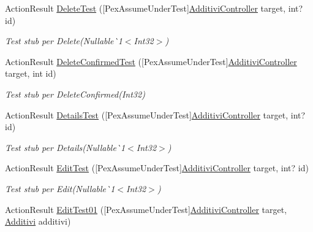 \begin{DoxyCompactItemize}
Action\+Result \mbox{\hyperlink{class_brew_day2_1_1_tests_1_1_additivi_controller_test_a00b7debb47483c49027e9a64b4bed1f7}{Delete\+Test}} (\mbox{[}Pex\+Assume\+Under\+Test\mbox{]}\mbox{\hyperlink{class_brew_day2_1_1_controllers_1_1_additivi_controller}{Additivi\+Controller}} target, int? id)
\begin{DoxyCompactList}\small\item\em Test stub per Delete(Nullable\`{}1$<$Int32$>$)\end{DoxyCompactList}\item 
Action\+Result \mbox{\hyperlink{class_brew_day2_1_1_tests_1_1_additivi_controller_test_adcd54e671aa425c1f7863a99ec0339ac}{Delete\+Confirmed\+Test}} (\mbox{[}Pex\+Assume\+Under\+Test\mbox{]}\mbox{\hyperlink{class_brew_day2_1_1_controllers_1_1_additivi_controller}{Additivi\+Controller}} target, int id)
\begin{DoxyCompactList}\small\item\em Test stub per Delete\+Confirmed(\+Int32)\end{DoxyCompactList}\item 
Action\+Result \mbox{\hyperlink{class_brew_day2_1_1_tests_1_1_additivi_controller_test_a4d2c41cfc7643d99f9bae1feeda05d0a}{Details\+Test}} (\mbox{[}Pex\+Assume\+Under\+Test\mbox{]}\mbox{\hyperlink{class_brew_day2_1_1_controllers_1_1_additivi_controller}{Additivi\+Controller}} target, int? id)
\begin{DoxyCompactList}\small\item\em Test stub per Details(Nullable\`{}1$<$Int32$>$)\end{DoxyCompactList}\item 
Action\+Result \mbox{\hyperlink{class_brew_day2_1_1_tests_1_1_additivi_controller_test_acbb2296c4d6dbd1ba170c5715c6cabf4}{Edit\+Test}} (\mbox{[}Pex\+Assume\+Under\+Test\mbox{]}\mbox{\hyperlink{class_brew_day2_1_1_controllers_1_1_additivi_controller}{Additivi\+Controller}} target, int? id)
\begin{DoxyCompactList}\small\item\em Test stub per Edit(Nullable\`{}1$<$Int32$>$)\end{DoxyCompactList}\item 
Action\+Result \mbox{\hyperlink{class_brew_day2_1_1_tests_1_1_additivi_controller_test_a54ded1817d33bfb67309ae0ebeb9122f}{Edit\+Test01}} (\mbox{[}Pex\+Assume\+Under\+Test\mbox{]}\mbox{\hyperlink{class_brew_day2_1_1_controllers_1_1_additivi_controller}{Additivi\+Controller}} target, \mbox{\hyperlink{class_brew_day2_1_1_models_1_1_additivi}{Additivi}} additivi)

\end{DoxyCompactItemize}
